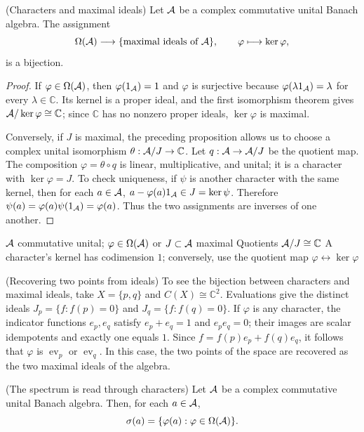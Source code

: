 \pagebreak
\begin{cthproposicion}{(Characters and maximal ideals)}
Let $\mathcal A$ be a complex commutative unital Banach algebra.
The assignment
\[
 \Omega(\mathcal A)\longrightarrow\{\text{maximal ideals of }\mathcal A\},\qquad
 \varphi\longmapsto\ker\varphi,
\]
is a bijection.
\end{cthproposicion}

\begin{proof}[Proof]
If $\varphi\in\Omega(\mathcal A)$, then $\varphi(1_\mathcal A)=1$ and
$\varphi$ is surjective because $\varphi(\lambda1_\mathcal A)=\lambda$
for every $\lambda\in\mathbb C$. Its kernel is a proper ideal, and the
first isomorphism theorem gives
$\mathcal A/\ker\varphi\cong\mathbb C$; since $\mathbb C$ has no
nonzero proper ideals, $\ker\varphi$ is maximal.

Conversely, if $J$ is maximal, the preceding proposition allows us to
choose a complex unital isomorphism
$\theta:\mathcal A/J\to\mathbb C$. Let
$q:\mathcal A\to\mathcal A/J$ be the quotient map. The composition
$\varphi=\theta\circ q$ is linear, multiplicative, and unital;
it is a character with $\ker\varphi=J$.
To check uniqueness, if $\psi$ is another character with the same
kernel, then for each $a\in\mathcal A$,
$a-\varphi(a)1_\mathcal A\in J=\ker\psi$. Therefore
$\psi(a)=\varphi(a)\psi(1_\mathcal A)=\varphi(a)$. Thus the two assignments
are inverses of one another.
\end{proof}

\proofdiagram
{$\mathcal A$ commutative unital; $\varphi\in\Omega(\mathcal A)$ or $J\subset\mathcal A$ maximal}
{Quotients $\mathcal A/J\cong\mathbb C$}
{A character's kernel has codimension $1$; conversely, use the quotient map}
{$\varphi\leftrightarrow\ker\varphi$}

\begin{cthejemplo}{(Recovering two points from ideals)}
To see the bijection between characters and maximal ideals,
take $X=\{p,q\}$ and $C(X)\cong\mathbb C^2$.
Evaluations give the distinct ideals
$J_p=\{f:f(p)=0\}$ and $J_q=\{f:f(q)=0\}$.
If $\varphi$ is any character, the indicator functions
$e_p,e_q$ satisfy $e_p+e_q=1$ and $e_pe_q=0$;
their images are scalar idempotents and exactly one equals $1$.
Since $f=f(p)e_p+f(q)e_q$, it follows that $\varphi$ is
$\operatorname{ev}_p$ or $\operatorname{ev}_q$.
In this case, the two points of the space are recovered as the
two maximal ideals of the algebra.
\end{cthejemplo}

\begin{cthteorema}{(The spectrum is read through characters)}
Let $\mathcal A$ be a complex commutative unital Banach algebra.
Then, for each $a\in\mathcal A$,
\[
 \sigma(a)=\{\varphi(a):\varphi\in\Omega(\mathcal A)\}.
\]
\end{cthteorema}

